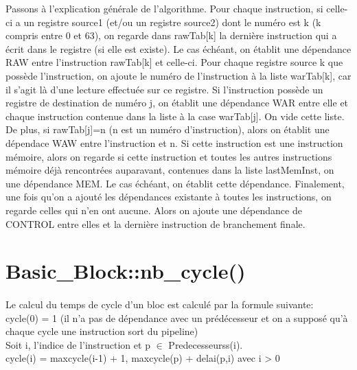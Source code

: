 \documentclass[a4paper,12pt]{report}
\begin{document}
Passons à l'explication générale de l'algorithme.
\newline 
\newline Pour chaque instruction, si celle-ci a un registre source1 (et/ou un registre source2) dont le numéro est k (k compris entre 0 et 63), on regarde dans  rawTab[k] la dernière instruction qui a écrit dans le registre (si elle est existe). Le cas échéant, on établit une dépendance RAW entre l'instruction rawTab[k] et celle-ci. 
\newline Pour chaque registre source k que possède l'instruction, on ajoute le numéro de l'instruction à la liste warTab[k], car il s'agit là d'une lecture effectuée sur ce registre.
\newline
\newline Si l'instruction possède un registre de destination de numéro j, on établit une dépendance WAR entre elle et chaque instruction contenue dans la liste à la case warTab[j]. On vide cette liste.
\newline De plus, si rawTab[j]=n (n est un numéro d'instruction), alors on établit une dépendace WAW entre l'instruction et n.
\newline
\newline Si cette instruction est une instruction mémoire, alors on regarde si cette instruction et toutes les autres instructions mémoire déjà rencontrées auparavant, contenues dans la liste lastMemInst, on une dépendance MEM. Le cas échéant, on établit cette dépendance.
\newline
\newline Finalement, une fois qu'on a ajouté les dépendances existante à toutes les instructions, on regarde celles qui n'en ont aucune. Alors on ajoute une dépendance de CONTROL entre elles et la dernière instruction de branchement finale.


\section{Basic\_Block::nb\_cycle()}
\paragraph*{}
Le calcul du temps de cycle d'un bloc est calculé par la formule suivante: \\
cycle(0) = 1 (il n'a pas de dépendance avec un prédécesseur et on a supposé qu'à chaque cycle une instruction sort du pipeline) \\
Soit i, l'indice de l'instruction et p $\in$ Predecesseurss(i). \\
cycle(i) = max{cycle(i-1) + 1, max{cycle(p) + delai(p,i)}} avec i > 0 
\end{document}
